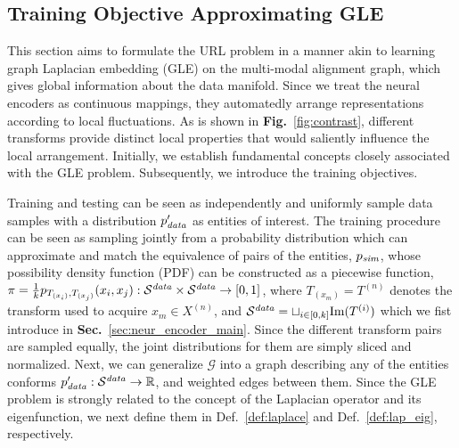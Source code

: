 \documentclass{article}
\begin{document}


\subsection{Training Objective Approximating GLE}\label{sec:desi}

This section aims to formulate the URL problem in a manner akin to learning graph Laplacian embedding (GLE) on the multi-modal alignment graph, which gives global information about the data manifold. Since we treat the neural encoders as continuous mappings, they automatedly arrange representations according to local fluctuations. As is shown in \textbf{Fig.}~\ref{fig:contrast}, different transforms provide distinct local properties that would saliently influence the local arrangement. Initially, we establish fundamental concepts closely associated with the GLE problem. Subsequently, we introduce the training objectives.

Training and testing can be seen as independently and uniformly sample data samples with a distribution $p_{\text{\textit{data}}}^\prime$ as entities of interest. The training procedure can be seen as sampling jointly from a probability distribution which can approximate and match the equivalence of pairs of the entities, $p_{\text{\textit{sim}}}$, whose possibility density function (PDF) can be constructed as a piecewise function, $ \pi = \frac 1 k p_{T_{(x_i)}, T_{(x_j)}}(x_i, x_j): \mathcal{S}^{\text{\textit{data}}} \times \mathcal{S}^{\text{\textit{data}}} \to [0,1]$, where $T_{(x_m)}=T^{(n)}$ denotes the transform used to acquire $x_m \in X^{(n)}$, and $\mathcal{S}^{\text{\textit{data}}} = \sqcup_{i \in [0,k]} \text{Im}(T^{(i)})$ which we fist introduce in \textbf{Sec.}~\ref{sec:neur_encoder_main}. Since the different transform pairs are sampled equally, the joint distributions for them are simply sliced and normalized. Next, we can generalize $\mathcal{G}$ into a graph describing any of the entities conforms $p_{\text{\textit{data}}}^\prime: \mathcal{S}^{\text{\textit{data}}} \to \mathbb{R}$, and weighted edges between them. Since the GLE problem is strongly related to the concept of the Laplacian operator and its eigenfunction, we next define them in Def.~\ref{def:laplace} and Def.~\ref{def:lap_eig}, respectively.

\end{document}
